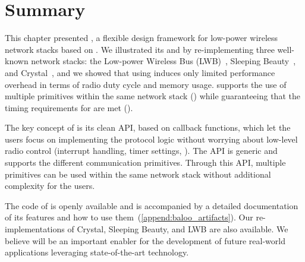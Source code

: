 
\section{Summary}

This chapter presented \baloo, a flexible design framework for low-power wireless network stacks based on \ST.
We illustrated its  and  by re-implementing three well-known network stacks: the Low-power Wireless Bus (LWB)~\cite{ferrari2012LWB}, Sleeping Beauty~\cite{sarkar2016Sleeping}, and Crystal~\cite{istomin2018Interferenceresilient}, and we showed that using \baloo induces only limited performance overhead in terms of radio duty cycle and memory usage.
\baloo supports the use of multiple \ST primitives within the same network stack () while guaranteeing that the timing requirements for \ST are met ().

The key concept of \baloo is its clean API, based on callback functions, which let the users focus on implementing the protocol logic without worrying about low-level radio control (interrupt handling, timer settings, \etc).
The API is generic and supports the different communication primitives. Through this API, multiple primitives can be used within the same network stack without additional complexity for the users.

\pagebreak
The code of \baloo is openly available and is accompanied by a detailed documentation of its features and how to use them~(\cref{append:baloo_artifacts}).
Our re-implementations of Crystal, Sleeping Beauty, and LWB are also available.
We believe \baloo will be an important enabler for the development of future real-world applications leveraging state-of-the-art \ST technology.
